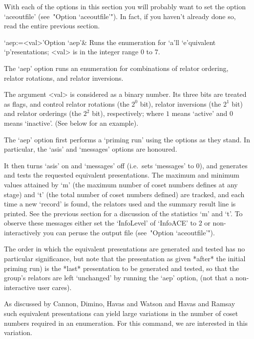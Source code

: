 With each of the options in this section you will probably want to set
the option `aceoutfile' (see~"Option `aceoutfile'"). In fact,  if  you
haven't already done so, read the entire previous section.

\beginitems

\>`aep:=<val>'{Option `aep'}&
Runs  the enumeration for `a'll `e'quivalent `p'resentations;
<val> is in the integer range 0 to 7.

The `aep' option runs  an  enumeration  for  combinations  of  relator
ordering, relator rotations, and relator inversions.

The argument <val> is considered as a binary number.  Its  three  bits
are treated as flags, and control relator rotations (the  $2^0$  bit),
relator inversions (the $2^1$ bit) and relator  orderings  (the  $2^2$
bit),  respectively;  where  $1$  means  \lq{}active'  and  $0$  means
\lq{}inactive'. (See below for an example).

The `aep' option first performs a \lq{}priming run' using the  options
as they stand. In particular, the `asis' and  `messages'  options  are
honoured.

It then turns `asis' on and `messages' off  (i.e.~sets  `messages'  to
0), and generates and tests the  requested  equivalent  presentations.
The maximum and minimum values attained by `m' (the maximum number  of
coset numbers defines at any stage) and `t' (the total number of coset
numbers defined) are tracked, and each  time  a  new  \lq{}record'  is
found, the relators used and the summary result line is  printed.  See
the previous section for a discussion of the statistics `m'  and  `t'.
To observe these messages either set the `InfoLevel' of `InfoACE' to 2
or  non-interactively  you  can  peruse   the   {\ACE}   output   file
(see~"Option `aceoutfile'").

The order in which the  equivalent  presentations  are  generated  and
tested has no particular significance, but note that the  presentation
as given *after* the initial priming run) is the  *last*  presentation
to be generated and tested, so that  the  group's  relators  are  left
`unchanged' by running the `aep' option, (not that  a  non-interactive
user cares).

As discussed by Cannon, Dimino, Havas  and  Watson  \cite{CDHW73}  and
Havas and Ramsay \cite{HR99b} such equivalent presentations can  yield
large variations in  the  number  of  coset  numbers  required  in  an
enumeration. For this command, we are interested in this variation.


